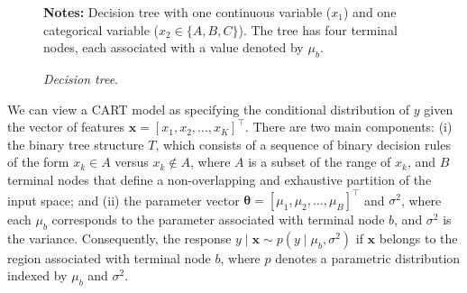 \begin{figure}[h!]
	\centering
{}
\begin{tablenotes}
	\item \small{\textbf{Notes:} Decision tree with one continuous variable ($x_1$) and one categorical variable ($x_2 \in \{A, B, C\}$). The tree has four terminal nodes, each associated with a value denoted by $\mu_b$.}
\end{tablenotes}
\caption{\textit{Decision tree}.}
\label{fig:tree}
\end{figure}	

We can view a CART model as specifying the conditional distribution of \( y \) given the vector of features \( \mathbf{x} = [x_1, x_2, \dots, x_K]^{\top} \). There are two main components: (i) the binary tree structure \( T \), which consists of a sequence of binary decision rules of the form \( x_k \in A \) versus \( x_k \notin A \), where \( A \) is a subset of the range of \( x_k \), and \( B \) terminal nodes that define a non-overlapping and exhaustive partition of the input space; and (ii) the parameter vector \( \boldsymbol{\theta} = [\mu_1, \mu_2, \dots, \mu_B]^{\top} \) and $\sigma^2$, where each \( \mu_b \) corresponds to the parameter associated with terminal node \( b \), and $\sigma^2$ is the variance. Consequently, the response \( y \mid \mathbf{x} \sim p(y \mid \mu_b,\sigma^2) \) if \( \mathbf{x} \) belongs to the region associated with terminal node \( b \), where \( p \) denotes a parametric distribution indexed by \( \mu_b \) and \( \sigma^2 \).

